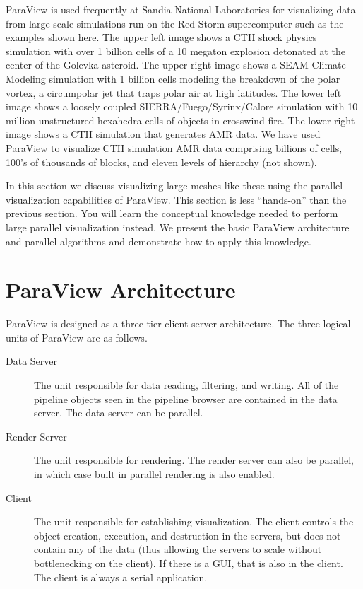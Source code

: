 ParaView is used frequently at Sandia National Laboratories for visualizing
data from large-scale simulations run on the Red Storm supercomputer such
as the examples shown here.  The upper left image shows a CTH shock physics
simulation with over 1 billion cells of a 10 megaton explosion detonated at
the center of the Golevka asteroid.  The upper right image shows a SEAM
Climate Modeling simulation with 1 billion cells modeling the breakdown of
the polar vortex, a circumpolar jet that traps polar air at high latitudes.
The lower left image shows a loosely coupled SIERRA/Fuego/Syrinx/Calore
simulation with 10 million unstructured hexahedra cells of
objects-in-crosswind fire.  The lower right image shows a CTH simulation
that generates AMR data.  We have used ParaView to visualize CTH simulation
AMR data comprising billions of cells, 100’s of thousands of blocks, and
eleven levels of hierarchy (not shown).

In this section we discuss visualizing large meshes like these using the
parallel visualization capabilities of ParaView.  This section is less
“hands-on” than the previous section.  You will learn the conceptual
knowledge needed to perform large parallel visualization instead.  We
present the basic ParaView architecture and parallel algorithms and
demonstrate how to apply this knowledge.


\section{ParaView Architecture}

ParaView is designed as a three-tier client-server architecture.  The three
logical units of ParaView are as follows.

\begin{description}
\item[Data Server]  The unit responsible for data
  reading, filtering, and writing.  All of the pipeline objects seen in the
  pipeline browser are contained in the data server.  The data server can
  be parallel.
\item[Render Server] The unit responsible for
  rendering.  The render server can also be parallel, in which case built
  in parallel rendering is also enabled.
\item[Client] The unit responsible for establishing
  visualization.  The client controls the object creation, execution, and
  destruction in the servers, but does not contain any of the data (thus
  allowing the servers to scale without bottlenecking on the client).  If
  there is a GUI, that is also in the client.  The client is always a
  serial application.
\end{description}

